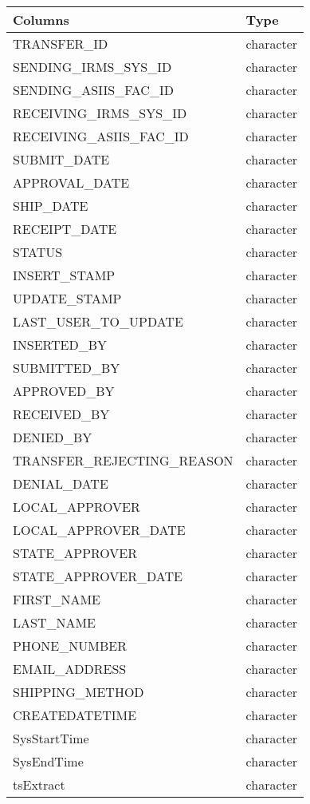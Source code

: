 \documentclass[
  letterpaper,
  DIV=11,
  numbers=noendperiod]{scrreprt}
\begin{document}
\begin{longtable}{ll}
\toprule
Columns & Type \\ 
\midrule
TRANSFER\_ID & character \\ 
SENDING\_IRMS\_SYS\_ID & character \\ 
SENDING\_ASIIS\_FAC\_ID & character \\ 
RECEIVING\_IRMS\_SYS\_ID & character \\ 
RECEIVING\_ASIIS\_FAC\_ID & character \\ 
SUBMIT\_DATE & character \\ 
APPROVAL\_DATE & character \\ 
SHIP\_DATE & character \\ 
RECEIPT\_DATE & character \\ 
STATUS & character \\ 
INSERT\_STAMP & character \\ 
UPDATE\_STAMP & character \\ 
LAST\_USER\_TO\_UPDATE & character \\ 
INSERTED\_BY & character \\ 
SUBMITTED\_BY & character \\ 
APPROVED\_BY & character \\ 
RECEIVED\_BY & character \\ 
DENIED\_BY & character \\ 
TRANSFER\_REJECTING\_REASON & character \\ 
DENIAL\_DATE & character \\ 
LOCAL\_APPROVER & character \\ 
LOCAL\_APPROVER\_DATE & character \\ 
STATE\_APPROVER & character \\ 
STATE\_APPROVER\_DATE & character \\ 
FIRST\_NAME & character \\ 
LAST\_NAME & character \\ 
PHONE\_NUMBER & character \\ 
EMAIL\_ADDRESS & character \\ 
SHIPPING\_METHOD & character \\ 
CREATEDATETIME & character \\ 
SysStartTime & character \\ 
SysEndTime & character \\ 
tsExtract & character \\ 
\bottomrule
\end{longtable}
\end{document}
